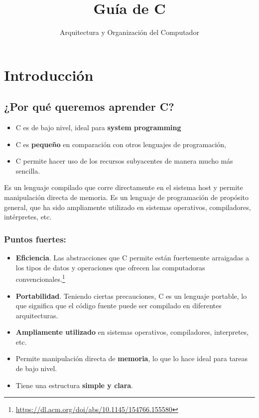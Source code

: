 \documentclass[]{scrartcl}
\title{Guía de C}
\subtitle{Arquitectura y Organización del Computador}
\date{}
\begin{document}
\maketitle

\section*{Introducción}
\subsection*{¿Por qué queremos aprender C?}

\begin{itemize}
  \item C es de bajo nivel, ideal para \textbf{system programming}
  \item C es \textbf{pequeño} en comparación con otros lenguajes de programación, 
  \item C permite hacer uso de los recursos subyacentes de manera mucho más sencilla.
\end{itemize}

Es un lenguaje compilado que corre directamente en el sistema host y permite manipulación directa de memoria. 
Es un lenguaje de programación de propósito general, que ha sido ampliamente utilizado en sistemas operativos, compiladores, intérpretes, etc.

\subsubsection*{Puntos fuertes:}
\begin{itemize}
  \item \textbf{Eficiencia}. Las abstracciones que C permite están fuertemente arraigadas a los tipos de datos y operaciones que ofrecen las computadoras convencionales.\footnote{\url{https://dl.acm.org/doi/abs/10.1145/154766.155580}}
  \item \textbf{Portabilidad}. Teniendo ciertas precauciones, C es un lenguaje portable, lo que significa que el código fuente puede ser compilado en diferentes arquitecturas.
  \item \textbf{Ampliamente utilizado} en sistemas operativos, compiladores, interpretes, etc.
  \item Permite manipulación directa de \textbf{memoria}, lo que lo hace ideal para tareas de bajo nivel.
  \item Tiene una estructura \textbf{simple y clara}. 
\end{itemize}
\end{document}
